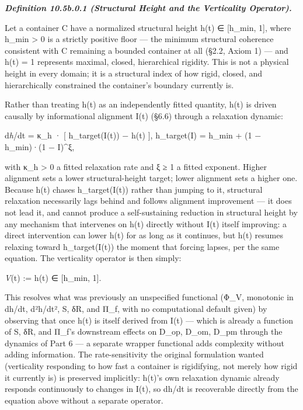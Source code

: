 \documentclass[
]{article}
\begin{document}
\emph{\textbf{Definition 10.5b.0.1 (Structural Height and the
Verticality Operator).}}

Let a container C have a normalized structural height h(t) ∈ {[}h\_min,
1{]}, where h\_min \textgreater{} 0 is a strictly positive floor --- the
minimum structural coherence consistent with C remaining a bounded
container at all (§2.2, Axiom 1) --- and h(t) = 1 represents maximal,
closed, hierarchical rigidity. This is not a physical height in every
domain; it is a structural index of how rigid, closed, and
hierarchically constrained the container's boundary currently is.

Rather than treating h(t) as an independently fitted quantity, h(t) is
driven causally by informational alignment I(t) (§6.6) through a
relaxation dynamic:

d\emph{h}/dt = κ\_h · {[} h\_target(I(t)) − h(t) {]}, h\_target(I) =
h\_min + (1 − h\_min)·(1 − I)\^{}ξ,

with κ\_h \textgreater{} 0 a fitted relaxation rate and ξ ≥ 1 a fitted
exponent. Higher alignment sets a lower structural-height target; lower
alignment sets a higher one. Because h(t) chases h\_target(I(t)) rather
than jumping to it, structural relaxation necessarily lags behind and
follows alignment improvement --- it does not lead it, and cannot
produce a self-sustaining reduction in structural height by any
mechanism that intervenes on h(t) directly without I(t) itself
improving: a direct intervention can lower h(t) for as long as it
continues, but h(t) resumes relaxing toward h\_target(I(t)) the moment
that forcing lapses, per the same equation. The verticality operator is
then simply:

\emph{V}(t) := h(t) ∈ {[}h\_min, 1{]}.

This resolves what was previously an unspecified functional (Φ\_V,
monotonic in dh/dt, d²h/dt², S, δR, and Π\_f, with no computational
default given) by observing that once h(t) is itself derived from I(t)
--- which is already a function of S, δR, and Π\_f's downstream effects
on D\_op, D\_om, D\_pm through the dynamics of Part 6 --- a separate
wrapper functional adds complexity without adding information. The
rate-sensitivity the original formulation wanted (verticality responding
to how fast a container is rigidifying, not merely how rigid it
currently is) is preserved implicitly: h(t)'s own relaxation dynamic
already responds continuously to changes in I(t), so dh/dt is
recoverable directly from the equation above without a separate
operator.
\end{document}
